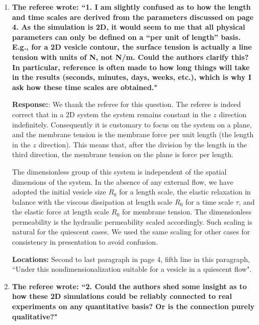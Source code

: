 \documentclass[12pt]{article}
\begin{document}
\begin{enumerate}

\item {\bf The referee wrote: ``1. I am slightly confused as to how the length and time scales are derived from the parameters discussed on page 4. As the simulation is 2D, it would seem to me that all physical parameters can only be defined on a “per unit of length” basis. E.g., for a 2D vesicle contour, the surface tension is actually a line tension with units of N, not N/m. Could the authors clarify this?
In particular, reference is often made to how long things will take in the results (seconds,
minutes, days, weeks, etc.), which is why I ask how these time scales are obtained."}

\noindent
{\bf Response:}: We thank the referee for this question. The referee is indeed correct that in a 2D system the system remains constant in the $z$ direction indefinitely. Consequently it is customary to focus on the system on a plane, and the membrane tension is the membrane force per unit length (the length in the $z$ direction). This means that, after the division by the length in the third direction, the membrane tension on the plane is force per length. 

The dimensionless group of this system is independent of the spatial dimensions of the system. In the absence of any external flow, we have adopted the initial vesicle size $R_0$ for a length scale,  the elastic relaxation in balance with the viscous dissipation at  length scale $R_0$ for a time scale $\tau$, and the elastic force at length scale $R_0$ for membrane tension. The dimensionless permeability is the hydraulic permeability scaled accordingly. Such scaling is natural for the quiescent cases. We used the same scaling for other cases for consistency in presentation to avoid confusion.

\noindent
{\bf Locations:} Second to last paragraph in page 4, fifth line in this paragraph, ``Under this nondimensionalization suitable for a vesicle in a quiescent flow".


\item {\bf The referee wrote: ``2. Could the authors shed some insight as to how these 2D simulations could be reliably connected to real experiments on any quantitative basis? Or is the connection purely
qualitative?"}


\end{enumerate}
\end{document}
